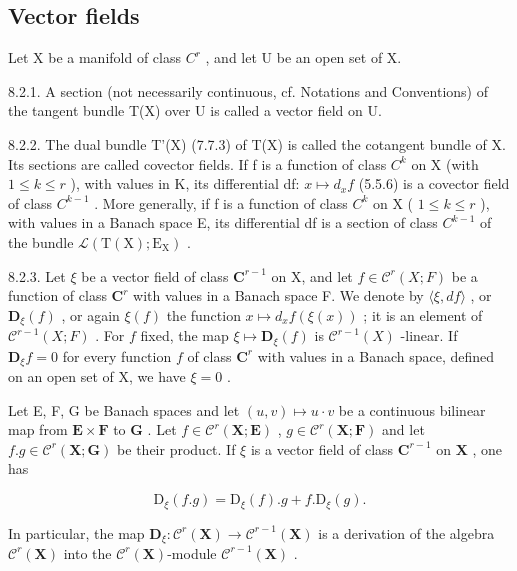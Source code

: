 \subsection{Vector fields}

Let X be a manifold of class \(C^{r}\) , and let U be an open set of X.

8.2.1. A section (not necessarily continuous, cf. Notations and Conventions) of the tangent bundle T(X) over U is called a vector field on U.

8.2.2. The dual bundle T'(X) (7.7.3) of T(X) is called the cotangent bundle of X. Its sections are called covector fields. If f is a function of class \(C^{k}\) on X (with \(1 \leqslant k \leqslant r\) ), with values in K, its differential df: \(x \mapsto d_{x}f\) (5.5.6) is a covector field of class \(C^{k-1}\) . More generally, if f is a function of class \(C^{k}\) on X ( \(1 \leqslant k \leqslant r\) ), with values in a Banach space E, its differential df is a section of class \(C^{k-1}\) of the bundle \(\mathcal{L}(\mathrm{T}(\mathrm{X}); \mathrm{E}_{\mathrm{X}})\) .

8.2.3. Let \(\xi\) be a vector field of class \(\mathbf{C}^{r-1}\) on X, and let \(f\in\mathcal{C}^{r}(X;F)\) be a function of class \(\mathbf{C}^{r}\) with values in a Banach space F. We denote by \(\langle\xi,df\rangle\) , or \(\mathbf{D}_{\xi}(f)\) , or again \(\xi(f)\) the function \(x\mapsto d_{x}f(\xi(x))\) ; it is an element of \(\mathcal{C}^{r-1}(X;F)\) . For \(f\) fixed, the map \(\xi\mapsto\mathbf{D}_{\xi}(f)\) is \(\mathcal{C}^{r-1}(X)\) -linear. If \(\mathbf{D}_{\xi}f=0\) for every function \(f\) of class \(\mathbf{C}^{r}\) with values in a Banach space, defined on an open set of X, we have \(\xi=0\) .

Let E, F, G be Banach spaces and let \((u, v) \mapsto u \cdot v\) be a continuous bilinear map from \(\mathbf{E} \times \mathbf{F}\) to \(\mathbf{G}\) . Let \(f \in \mathcal{C}^r(\mathbf{X}; \mathbf{E})\) , \(g \in \mathcal{C}^r(\mathbf{X}; \mathbf{F})\) and let \(f.g \in \mathcal{C}^r(\mathbf{X}; \mathbf{G})\) be their product. If \(\xi\) is a vector field of class \(\mathbf{C}^{r-1}\) on \(\mathbf{X}\) , one has

\[
\mathrm{D} _ {\xi} (f. g) = \mathrm{D} _ {\xi} (f). g + f. \mathrm{D} _ {\xi} (g).
\]

In particular, the map \(\mathbf{D}_{\xi}\colon\mathcal{C}^{r}(\mathbf{X})\to\mathcal{C}^{r-1}(\mathbf{X})\) is a derivation of the algebra \(\mathcal{C}^{r}(\mathbf{X})\) into the \(\mathcal{C}^{r}(\mathbf{X})\)-module \(\mathcal{C}^{r-1}(\mathbf{X})\) .


